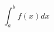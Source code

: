 \documentclass[fleqn]{article}
\begin{document}
	\thispagestyle{empty}
	\parindent0cm
	\begin{displaymath}
		\int_a^b f(x)dx\,
	\end{displaymath}
\end{document}
